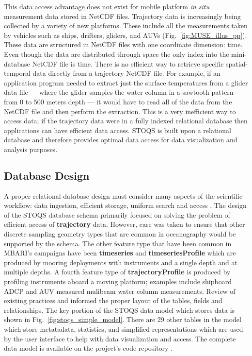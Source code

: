 \documentclass[conference]{IEEEtran}
\begin{document}
This data access advantage does not exist for mobile platform \textit{in situ} measurement data stored in NetCDF files. Trajectory data is increasingly being collected by a variety of new platforms. These include all the measurements taken by vehicles such as ships, drifters, gliders, and AUVs (Fig.~\ref{fig:MUSE_illus_pp}). These data are structured in NetCDF files with one coordinate dimension: time. Even though the data are distributed through space the only index into the mini-database NetCDF file is time. There is no efficient way to retrieve specific spatial-temporal data directly from a trajectory NetCDF file. For example, if an application program needed to extract just the surface temperatures from a glider data file --- where the glider samples the water column in a sawtooth pattern from 0 to 500 meters depth --- it would have to read all of the data from the NetCDF file and then perform the extraction. This is a very inefficient way to access data; if the trajectory data were in a fully indexed relational database then applications can have efficient data access. STOQS is built upon a relational database and therefore provides optimal data access for data visualization and analysis purposes.


\subsection{Database Design}
A proper relational database design must consider many aspects of the scientific workflow: data ingestion, efficient storage, uniform search and access \cite{Bechini:2013:MSS:2425433.2425647}. The design of the STOQS database schema primarily focused on solving the problem of efficient access of \textbf{trajectory} data. However, care was taken to ensure that other discrete sampling geometry types \cite{DSG} that are common in oceanography would be supported by the schema.  The other feature type that have been common in MBARI's campaigns have been \textbf{timeseries} and \textbf{timeseriesProfile} which are produced by mooring deployments with instruments and a single depth and at multiple depths. 
A fourth feature type of \textbf{trajectoryProfile} is produced by profiling instruments aboard a moving platform; examples include shipboard ADCP and AUV measured mulibeam water column measurements.  Review of existing practices \cite{Wright} and \cite{MODB} informed the proper layout of the tables, fields and relationships.  The key portion of the STOQS data model which stores data is shown in Fig.~\ref{fig:stoqs_simple_model}. There are 29 other tables in the model which store metatadata, statistics, and simplified representations which are used by the user interface to help with data visualization and access. The complete data model is available on the project's code repository \cite{STOQS}. 
\end{document}

